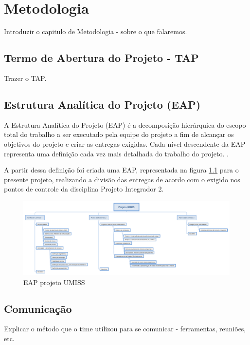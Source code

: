 \chapter{Metodologia}

Introduzir o capitulo de Metodologia - sobre o que falaremos.

\section{Termo de Abertura do Projeto - TAP}

Trazer o TAP.

\section{Estrutura Analítica do Projeto (EAP)}

A Estrutura Analítica do Projeto (EAP) é a decomposição hierárquica do escopo 
total do trabalho a ser executado pela equipe do projeto a fim de alcançar 
os objetivos do projeto e criar as entregas exigidas. Cada nível descendente 
da EAP representa uma definição cada vez mais detalhada do trabalho do 
projeto. \cite{pmbok}.

A partir dessa definição foi criada uma EAP, representada na figura \ref{eapfigura}
para o presente projeto, realizando 
a divisão das entregas de acordo com o exigido nos pontos de controle da 
disciplina Projeto Integrador 2.

\begin{figure}[h]
    \centering
    \label{eapfigura}
    \includegraphics[keepaspectratio=true,scale=0.18]{figuras/eap}
    \caption{EAP projeto UMISS}
\end{figure}

\section{Comunicação}

Explicar o método que o time utilizou para se comunicar - ferramentas, reuniões, etc.

